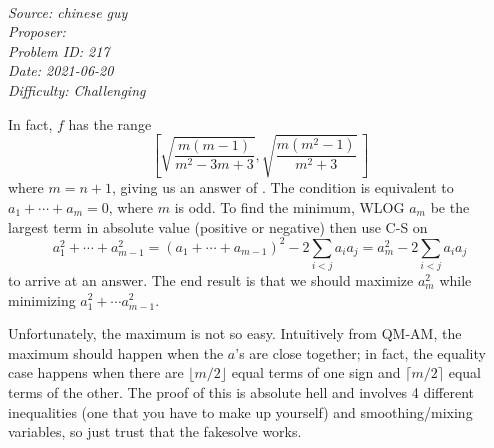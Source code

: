 \SSbreak\\
\emph{Source: chinese guy}\\
\emph{Proposer: \Paiya}\\ %
\emph{Problem ID: 217}\\
\emph{Date: 2021-06-20}\\
\emph{Difficulty: Challenging}\\
\SSbreak

\bigskip

\begin{solution}\hfil\medskip
  
    In fact, $f$ has the range $$\left[\sqrt{\dfrac{m(m-1)}{m^2-3m+3}}, \sqrt{\dfrac{m\left(m^2-1\right)}{m^2+3}}\,\right]$$ where $m = n + 1$, giving us an answer of . 
    The condition is equivalent to $a_1 + \cdots + a_m = 0$, where $m$ is odd. To find the minimum, WLOG $a_m$ be the largest term in absolute value (positive or negative) 
    then use C-S on $$a_1^2 + \cdots + a_{m-1}^2 = \left(a_1 + \cdots + a_{m-1}\right)^2 - 2 \sum_{i < j} a_ia_j = a_m^2 - 2 \sum_{i < j} a_ia_j$$ to arrive at 
    an answer. The end result is that we should maximize $a_m^2$ while minimizing $a_1^2 + \cdots a_{m-1}^2$. \medskip

    Unfortunately, the maximum is not so easy. Intuitively from QM-AM, the maximum should happen when the $a$'s are close together; in fact, the equality 
    case happens when there are $\lfloor m/2 \rfloor$ equal terms of one sign and $\lceil m/2 \rceil$ equal terms of the other. The proof of this is absolute 
    hell and involves 4 different inequalities (one that you have to make up yourself) and smoothing/mixing variables, so just trust that the fakesolve works.
\end{solution}\bigskip
